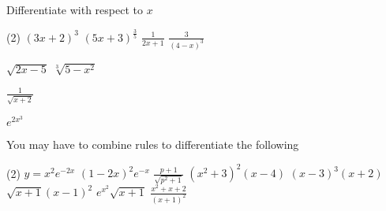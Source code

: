 \begin{Exercise}[title={Rate of Change},label=exRateOfChange]
\begin{Exercise}[title={Product, Quotient, & Chain Rules},label=exPQCRules]
	\Question Differentiate with respect to $x$
\begin{tasks}(2)
	\task $\left (3 x +2\right )^{3}$ %
	\task $\left (5 x +3\right )^{\frac{3}{5}}$%
	\task $\frac{1}{2 x +1}$%
	\task $\frac{3}{\left (4 -x\right )^{3}}$ %
	
	\task $\sqrt{2 x -5}$ %
	\task $\sqrt[{3}]{5 -x^{2}}$%
	
	\task $\frac{1}{\sqrt{x +2}}$ %
	
	\task $e^{2 x^{3}}$ %
\end{tasks}

	\Question You may have to combine rules to differentiate the following
\begin{tasks}(2)
	\task  $y =x^{2} e^{ -2 x}$ %
	\task $\left (1 -2 x\right )^{2} e^{ -x}$  %
	\task $\frac{p +1}{\sqrt{p^{2} +1}}$ %
	\task $\left (x^{2} +3\right )^{2} \left (x -4\right )$ %
	\task  $\left (x -3\right )^{3} \left (x +2\right )$  %
	\task $\sqrt{x +1} \left (x -1\right )^{2}$ %
	\task $e^{x^{2}} \sqrt{x +1}$ %
	\task $\frac{x^{2} +x +2}{\left (x +1\right )^{2}}$ %
\end{tasks}

\end{Exercise}
\begin{Answer}[ref={exPQCRules}]
	
\end{Answer}%


\end{Exercise}
